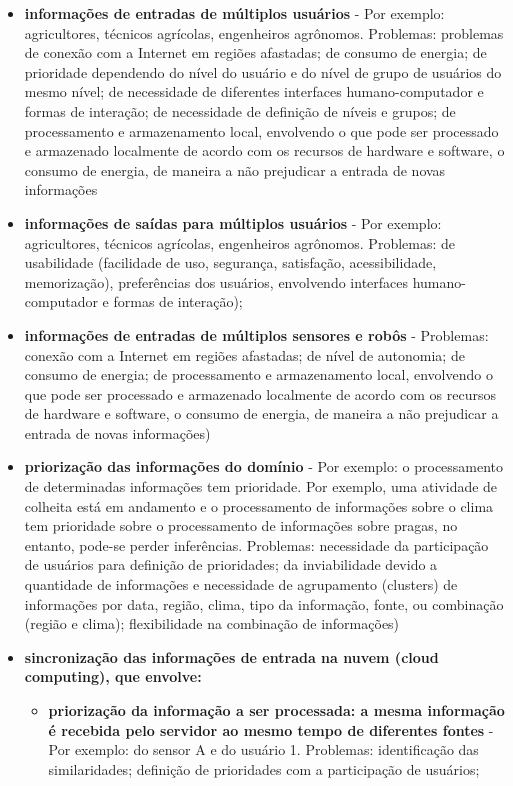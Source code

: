 \begin{itemize}
	\item \textbf{informações de entradas de múltiplos usuários} - Por exemplo: agricultores, técnicos agrícolas, engenheiros agrônomos. Problemas: problemas de conexão com a Internet em regiões afastadas; de consumo de energia; de prioridade dependendo do nível do usuário e do nível de grupo de usuários do mesmo nível; de necessidade de diferentes interfaces humano-computador e formas de interação; de necessidade de definição de níveis e grupos; de processamento e armazenamento local, envolvendo o que pode ser processado e armazenado localmente de acordo com os recursos de hardware e software, o consumo de energia, de maneira a não prejudicar a entrada de novas informações
	\item \textbf{informações de saídas para múltiplos usuários} - Por exemplo: agricultores, técnicos agrícolas, engenheiros agrônomos. Problemas: de usabilidade (facilidade de uso, segurança, satisfação, acessibilidade, memorização), preferências dos usuários, envolvendo interfaces humano-computador e formas de interação);
	\item \textbf{informações de entradas de múltiplos sensores e robôs} - Problemas: conexão com a Internet em regiões afastadas; de nível de autonomia; de consumo de energia; de processamento e armazenamento local, envolvendo o que pode ser processado e armazenado localmente de acordo com os recursos de hardware e software, o consumo de energia, de maneira a não prejudicar a entrada de novas informações)
	\item \textbf{priorização das informações do domínio} - Por exemplo: o processamento de determinadas informações tem prioridade. Por exemplo, uma atividade de colheita está em andamento e o processamento de informações sobre o clima tem prioridade sobre o processamento de informações sobre pragas, no entanto, pode-se perder inferências. Problemas: necessidade da participação de usuários para definição de prioridades; da inviabilidade devido a quantidade de informações e necessidade de agrupamento (clusters) de informações por data, região, clima, tipo da informação, fonte, ou combinação (região e clima); flexibilidade na combinação de informações)
	\item \textbf{sincronização das informações de entrada na nuvem (cloud computing), que  envolve:}
		\begin{itemize}
			\item \textbf{priorização da informação a ser processada: a mesma informação é recebida pelo servidor ao mesmo tempo de diferentes fontes} - Por exemplo: do sensor A e do usuário 1. Problemas: identificação das similaridades; definição de prioridades com a participação de usuários;

\end{itemize}
\end{itemize}
